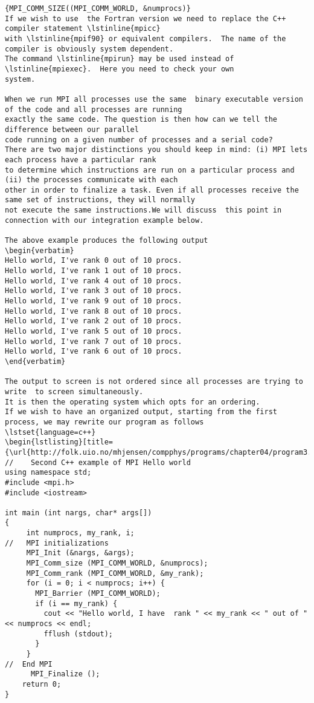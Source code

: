 \begin{lstlisting}{MPI_COMM_SIZE((MPI_COMM_WORLD, &numprocs)}
If we wish to use  the Fortran version we need to replace the C++ compiler statement \lstinline{mpicc}
with \lstinline{mpif90} or equivalent compilers.  The name of the compiler is obviously system dependent.  
The command \lstinline{mpirun} may be used instead of \lstinline{mpiexec}.  Here you need to check your own
system.

When we run MPI all processes use the same  binary executable version of the code and all processes are running
exactly the same code. The question is then how can we tell the difference between our parallel
code running on a given number of processes and a serial code?
There are two major distinctions you should keep in mind: (i) MPI lets each process have a particular rank
to determine which instructions are run on a particular process and (ii) the processes communicate with each
other in order to finalize a task. Even if all processes receive the same set of instructions, they will normally
not execute the same instructions.We will discuss  this point in connection with our integration example below.
 
The above example produces the following output
\begin{verbatim}
Hello world, I've rank 0 out of 10 procs.
Hello world, I've rank 1 out of 10 procs.
Hello world, I've rank 4 out of 10 procs.
Hello world, I've rank 3 out of 10 procs.
Hello world, I've rank 9 out of 10 procs.
Hello world, I've rank 8 out of 10 procs.
Hello world, I've rank 2 out of 10 procs.
Hello world, I've rank 5 out of 10 procs.
Hello world, I've rank 7 out of 10 procs.
Hello world, I've rank 6 out of 10 procs.
\end{verbatim}

The output to screen is not ordered since all processes are trying to write  to screen simultaneously.
It is then the operating system which opts for an ordering.  
If we wish to have an organized output, starting from the first process, we may rewrite our program as follows
\lstset{language=c++}
\begin{lstlisting}[title={\url{http://folk.uio.no/mhjensen/compphys/programs/chapter04/program3.cpp}}]
//    Second C++ example of MPI Hello world
using namespace std;
#include <mpi.h>
#include <iostream>

int main (int nargs, char* args[])
{
     int numprocs, my_rank, i;
//   MPI initializations
     MPI_Init (&nargs, &args);
     MPI_Comm_size (MPI_COMM_WORLD, &numprocs);
     MPI_Comm_rank (MPI_COMM_WORLD, &my_rank);
     for (i = 0; i < numprocs; i++) {
       MPI_Barrier (MPI_COMM_WORLD);
       if (i == my_rank) {
         cout << "Hello world, I have  rank " << my_rank << " out of " << numprocs << endl;
         fflush (stdout);
       }
     }
//  End MPI
      MPI_Finalize ();
    return 0;
}
\end{lstlisting}
